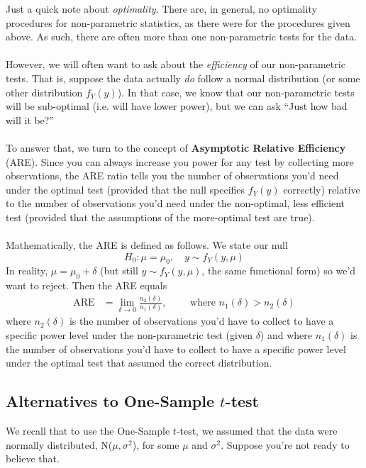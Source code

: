 \documentclass[a4paper,12pt]{scrartcl}
\begin{document}
Just a quick note about \emph{optimality}.  There are, in
general, no optimality procedures for non-parametric statistics, as
there were for the procedures given above.  As such, there are
often more than one non-parametric tests for the data.
\\
\\
However, we will often want to ask about the \emph{efficiency} of
our non-parametric tests.  That is, suppose the data actually 
\emph{do} follow a normal distribution (or some other distribution
$f_Y(y)$).  In that case, we know that our non-parametric tests 
will be sub-optimal (i.e. will have lower power), 
but we can ask ``Just how bad will it be?''
\\
\\
To answer that, we turn to the concept of \textbf{Asymptotic Relative
Efficiency} (ARE). Since you can always increase you power for
any test by collecting more observations, the ARE ratio tells you
the number of observations you'd need under the optimal test
(provided that the null specifies $f_Y(y)$ correctly) 
relative to the number
of observations you'd need under the non-optimal, less efficient
test (provided that the assumptions of the more-optimal test are true).
\\
\\
Mathematically, the ARE is defined as follows. We state our null 
   \[ H_0: \mu = \mu_0,\quad y \sim f_Y(y, \mu) \] 
In reality, $\mu=\mu_0 + \delta$ (but still $y\sim f_Y(y, \mu)$, the 
same functional form) so we'd want to reject. 
Then the ARE equals
\begin{align*}
   \text{ARE} &= \lim_{\delta \rightarrow 0} \frac{n_2(\delta)}{
   n_1(\delta)}, \qquad \text{ where } n_1(\delta) > n_2(\delta)
\end{align*}
where $n_2(\delta)$ is the number of observations you'd have to collect
to have a specific power level under the non-parametric test
(given $\delta$) and where 
$n_1(\delta)$ is the number of observations you'd have to collect
to have a specific power level under the optimal test that assumed
the correct distribution.



\newpage
\subsection{Alternatives to One-Sample $t$-test}

We recall that to use the One-Sample $t$-test, we assumed that the
data were normally distributed, N($\mu,\sigma^2$), for some
$\mu$ and $\sigma^2$. Suppose you're not ready to believe that.
\end{document}
